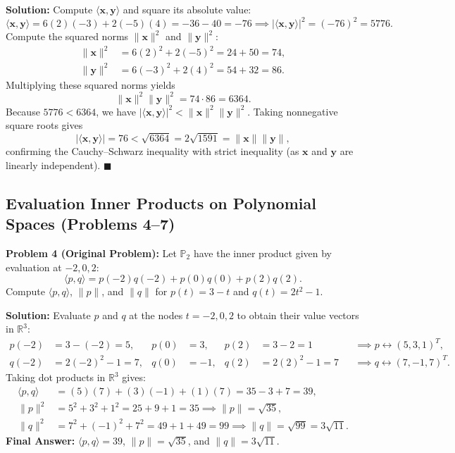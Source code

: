 \documentclass[11pt, letterpaper]{article}
\theoremstyle{definition}
\theoremstyle{remark}
\begin{document}
\textbf{Solution:} Compute $\langle \mathbf{x}, \mathbf{y} \rangle$ and square its absolute value:
\[
\langle \mathbf{x}, \mathbf{y} \rangle = 6(2)(-3) + 2(-5)(4) = -36 - 40 = -76 \implies |\langle \mathbf{x}, \mathbf{y} \rangle|^2 = (-76)^2 = 5776.
\]
Compute the squared norms $\|\mathbf{x}\|^2$ and $\|\mathbf{y}\|^2$:
\begin{align*}
\|\mathbf{x}\|^2 &= 6(2)^2 + 2(-5)^2 = 24 + 50 = 74, \\
\|\mathbf{y}\|^2 &= 6(-3)^2 + 2(4)^2 = 54 + 32 = 86.
\end{align*}
Multiplying these squared norms yields
\[
\|\mathbf{x}\|^2 \|\mathbf{y}\|^2 = 74 \cdot 86 = 6364.
\]
Because $5776 < 6364$, we have $|\langle \mathbf{x}, \mathbf{y} \rangle|^2 < \|\mathbf{x}\|^2 \|\mathbf{y}\|^2$. Taking nonnegative square roots gives
\[
|\langle \mathbf{x}, \mathbf{y} \rangle| = 76 < \sqrt{6364} = 2\sqrt{1591} = \|\mathbf{x}\|\|\mathbf{y}\|,
\]
confirming the Cauchy--Schwarz inequality with strict inequality (as $\mathbf{x}$ and $\mathbf{y}$ are linearly independent). $\blacksquare$

\subsection{Evaluation Inner Products on Polynomial Spaces (Problems 4--7)}

\textbf{Problem 4 (Original Problem):} Let $\mathbb{P}_2$ have the inner product given by evaluation at $-2, 0, 2$:
\[
\langle p, q \rangle = p(-2)q(-2) + p(0)q(0) + p(2)q(2).
\]
Compute $\langle p, q \rangle$, $\|p\|$, and $\|q\|$ for $p(t) = 3 - t$ and $q(t) = 2t^2 - 1$.

\textbf{Solution:} Evaluate $p$ and $q$ at the nodes $t = -2, 0, 2$ to obtain their value vectors in $\mathbb{R}^3$:
\begin{align*}
p(-2) &= 3 - (-2) = 5, & p(0) &= 3, & p(2) &= 3 - 2 = 1 & &\implies p \leftrightarrow (5, 3, 1)^T, \\
q(-2) &= 2(-2)^2 - 1 = 7, & q(0) &= -1, & q(2) &= 2(2)^2 - 1 = 7 & &\implies q \leftrightarrow (7, -1, 7)^T.
\end{align*}
Taking dot products in $\mathbb{R}^3$ gives:
\begin{align*}
\langle p, q \rangle &= (5)(7) + (3)(-1) + (1)(7) = 35 - 3 + 7 = 39, \\
\|p\|^2 &= 5^2 + 3^2 + 1^2 = 25 + 9 + 1 = 35 \implies \|p\| = \sqrt{35}, \\
\|q\|^2 &= 7^2 + (-1)^2 + 7^2 = 49 + 1 + 49 = 99 \implies \|q\| = \sqrt{99} = 3\sqrt{11}.
\end{align*}
\textbf{Final Answer:} $\langle p, q \rangle = 39$, $\|p\| = \sqrt{35}$, and $\|q\| = 3\sqrt{11}$.
\end{document}
